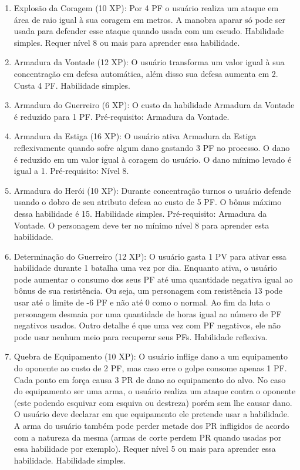 \begin{enumerate}
	\item Explosão da Coragem (10 XP): Por 4 PF o usuário realiza um ataque em área de raio igual à sua coragem em metros. A manobra aparar só pode ser usada para defender esse ataque quando usada com um escudo. Habilidade simples. Requer nível 8 ou mais para aprender essa habilidade.

	\item Armadura da Vontade (12 XP): O usuário transforma um valor igual à sua concentração em defesa automática, além disso sua defesa aumenta em 2. Custa 4 PF. Habilidade simples.

	\item Armadura do Guerreiro (6 XP): O custo da habilidade Armadura da Vontade é reduzido para 1 PF. Pré-requisito: Armadura da Vontade. 

	\item Armadura da Estiga (16 XP): O usuário ativa Armadura da Estiga reflexivamente quando sofre algum dano gastando 3 PF no processo. O dano é reduzido em um valor igual à coragem do usuário. O dano mínimo levado é igual a 1. Pré-requisito: Nível 8. 

	\item Armadura do Herói (10 XP): Durante concentração turnos o usuário defende usando o dobro de seu atributo defesa ao custo de 5 PF. O bônus máximo dessa habilidade é 15. Habilidade simples. Pré-requisito: Armadura da Vontade. O personagem deve ter no mínimo nível 8 para aprender esta habilidade.

	\item Determinação do Guerreiro (12 XP): O usuário gasta 1 PV para ativar essa habilidade durante 1 batalha uma vez por dia. Enquanto ativa, o usuário pode aumentar o consumo dos seus PF até uma quantidade negativa igual ao bônus de sua resistência. Ou seja, um personagem com resistência 13 pode usar até o limite de -6 PF e não até 0 como o normal. Ao fim da luta o personagem desmaia por uma quantidade de horas igual ao número de PF negativos usados. Outro detalhe é que uma vez com PF negativos, ele não pode usar nenhum meio para recuperar seus PFs. Habilidade reflexiva.

	\item Quebra de Equipamento (10 XP): O usuário inflige dano a um equipamento do oponente ao custo de 2 PF, mas caso erre o golpe consome apenas 1 PF. Cada ponto em força causa 3 PR de dano ao equipamento do alvo. No caso do equipamento ser uma arma, o usuário realiza um ataque contra o oponente (este podendo esquivar com esquiva ou destreza) porém sem lhe causar dano. O usuário deve declarar em que equipamento ele pretende usar a habilidade. A arma do usuário também pode perder metade dos PR infligidos de acordo com a natureza da mesma (armas de corte perdem PR quando usadas por essa habilidade por exemplo). Requer nível 5 ou mais para aprender essa habilidade. Habilidade simples.


\end{enumerate}
